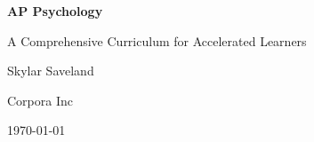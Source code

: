 \begin{titlepage}
    \centering
    \vspace*{1in}
    {\Huge\bfseries AP Psychology \par}
    {\Large A Comprehensive Curriculum for Accelerated Learners\par}
    \vspace{1in}
    {\Large Skylar Saveland\par}
    {\Large Corpora Inc\par}
    \vfill
    {\large \today\par}
\end{titlepage}
